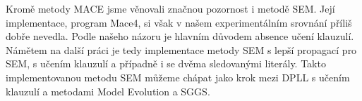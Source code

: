 Kromě metody MACE jsme
věnovali značnou pozornost i metodě SEM.
Její implementace, program Mace4, si však v našem experimentálním
srovnání příliš dobře nevedla. Podle našeho názoru
je hlavním důvodem absence učení klauzulí.
Námětem na další práci je tedy implementace metody SEM
s lepší propagací pro SEM, s učením klauzulí
a případně i se dvěma sledovanými literály.
Takto implementovanou metodu SEM můžeme chápat jako krok
mezi DPLL s učením klauzulí a metodami Model Evolution a SGGS.


%
%
%
%
%


